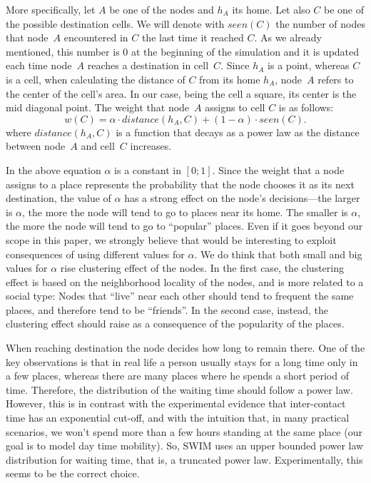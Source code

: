\documentclass[conference]{IEEEtran}
\begin{document}
More specifically, let $A$ be one of the nodes and $h_A$ its home. Let also $C$
be one of the possible destination cells. We will denote with $\textit{seen}(C)$
the number of nodes that node~$A$ encountered in $C$ the last time it reached
$C$. As we already mentioned, this number is $0$ at the beginning of the
simulation and it is updated each time node~$A$ reaches a destination in
cell~$C$. Since $h_A$ is a point, whereas $C$ is a cell, when calculating the
distance of $C$ from its home $h_A$, node~$A$ refers to the center of the cell's
area. In our case, being the cell a square, its center is the mid diagonal
point. The weight that node~$A$ assigns to cell $C$ is as follows:
\begin{equation}
\label{eq:weight}
w(C) = \alpha\cdot\textit{distance}(h_A, C) + (1-\alpha)\cdot\textit{seen}(C).
\end{equation}
where $\textit{distance}(h_A, C)$ is a function that decays as a power law as
the distance between node~$A$ and cell~$C$ increases.

In the above equation $\alpha$ is a constant in $[0;1]$. Since the weight that a
node assigns to a place represents the probability that the node chooses it as
its next destination, the value of $\alpha$ has a strong effect on the node's
decisions---the larger is $\alpha$, the more the node will tend to go to places
near its home. The smaller is $\alpha$, the more the node will tend to go to
``popular'' places. Even if it goes beyond our scope in this paper, we strongly
believe that would be interesting to exploit consequences of using different
values for $\alpha$. We do think that both small and big values for $\alpha$
rise clustering effect of the nodes. In the first case, the clustering effect
is based on the neighborhood locality of the nodes, and is more related to a
social type: Nodes that ``live'' near each other should tend to frequent the
same places, and therefore tend to be ``friends''. In the second case, instead,
the clustering effect should raise as a consequence of the popularity of the
places.

When reaching destination the node decides how long to remain there. One of the
key observations is that in real life a person usually stays for a long time
only in a few places, whereas there are many places where he spends a short
period of time. Therefore, the distribution of the waiting time should follow a
power law. However, this is in contrast with the experimental evidence that
inter-contact time has an exponential cut-off, and with the intuition that, in
many practical scenarios, we won't spend more than a few hours standing at the
same place (our goal is to model day time mobility). So, SWIM uses an upper
bounded power law distribution for waiting time, that is, a truncated power law.
Experimentally, this seems to be the correct choice.
\end{document}
